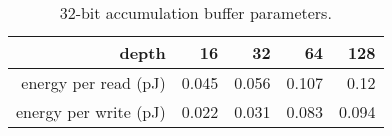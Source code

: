 \begin{table}[htbp]
  \centering
  \caption{32-bit accumulation buffer parameters.}
    \begin{tabular}{|r|r|r|r|r|}
    \hline
    depth & 16    & 32    & 64    & 128 \\
    \hline
    energy per read (pJ) & 0.045 & 0.056 & 0.107 & 0.12 \\
    \hline
    energy per write (pJ) & 0.022 & 0.031 & 0.083 & 0.094 \\
    \hline
    \end{tabular}%
  \label{tab:small_buf}%
\end{table}%